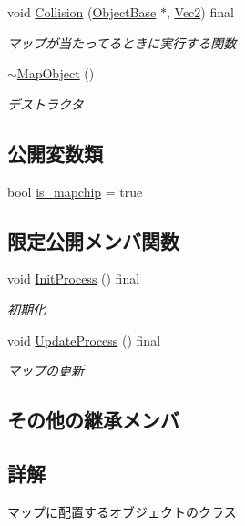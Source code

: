 \begin{DoxyCompactItemize}
void \mbox{\hyperlink{class_map_object_a76b9161f2723272ad361d0b190e46245}{Collision}} (\mbox{\hyperlink{class_object_base}{Object\+Base}} $\ast$, \mbox{\hyperlink{common_8h_ae148fff5818e9444b4ab2288829559bf}{Vec2}}) final
\begin{DoxyCompactList}\small\item\em マップが当たってるときに実行する関数 \end{DoxyCompactList}\item 
\mbox{\hyperlink{class_map_object_aa601344267a49df197e841fcbd732209}{$\sim$\+Map\+Object}} ()
\begin{DoxyCompactList}\small\item\em デストラクタ \end{DoxyCompactList}\end{DoxyCompactItemize}
\subsection*{公開変数類}
\begin{DoxyCompactItemize}
\item 
bool \mbox{\hyperlink{class_map_object_a21c5d70f23cca2a184297d766cc6acdc}{is\+\_\+mapchip}} = true
\end{DoxyCompactItemize}
\subsection*{限定公開メンバ関数}
\begin{DoxyCompactItemize}
\item 
void \mbox{\hyperlink{class_map_object_a3043cddb8aaad0eab27a076e9bee0284}{Init\+Process}} () final
\begin{DoxyCompactList}\small\item\em 初期化 \end{DoxyCompactList}\item 
void \mbox{\hyperlink{class_map_object_ab6b8849f15175417eca94b2703945e4b}{Update\+Process}} () final
\begin{DoxyCompactList}\small\item\em マップの更新 \end{DoxyCompactList}\end{DoxyCompactItemize}
\subsection*{その他の継承メンバ}


\subsection{詳解}
マップに配置するオブジェクトのクラス 

